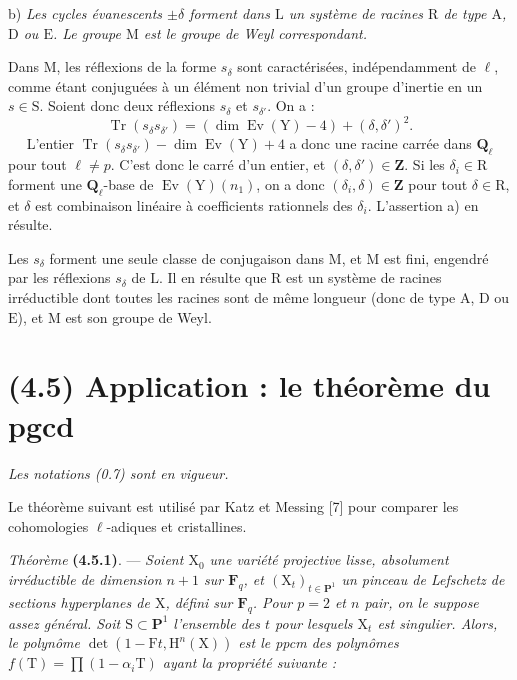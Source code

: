 \documentclass[11pt,leqno]{article}
\newcommand{\Page}[1]{\ifvmode\noindent\else\unskip\ \fi{\footnotesize\textcolor{gray}{[p.\,#1]}}\ \ignorespaces}
\begin{document}
b) \textit{Les cycles évanescents \(\pm\delta\) forment dans \(\mathrm{L}\) un système de racines \(\mathrm{R}\) de type \(\mathrm{A}\), \(\mathrm{D}\) ou \(\mathrm{E}\). Le groupe \(\mathrm{M}\) est le groupe de Weyl correspondant.}

Dans \(\mathrm{M}\), les réflexions de la forme \(s_\delta\) sont caractérisées, indépendamment de \(\ell\), comme étant conjuguées à un élément non trivial d’un groupe d’inertie en un \(s\in\mathrm{S}\). Soient donc deux réflexions \(s_\delta\) et \(s_{\delta'}\). On a :
\[
\operatorname{Tr}(s_\delta s_{\delta'})
=(\dim\operatorname{Ev}(\mathrm{Y})-4)+(\delta,\delta')^2.
\]
\Page{231}
L’entier \(\operatorname{Tr}(s_\delta s_{\delta'})-\dim\operatorname{Ev}(\mathrm{Y})+4\) a donc une racine carrée dans \(\mathbf{Q}_\ell\) pour tout \(\ell\neq p\). C’est donc le carré d’un entier, et \((\delta,\delta')\in\mathbf{Z}\). Si les \(\delta_i\in\mathrm{R}\) forment une \(\mathbf{Q}_\ell\)-base de \(\operatorname{Ev}(\mathrm{Y})(n_1)\), on a donc \((\delta_i,\delta)\in\mathbf{Z}\) pour tout \(\delta\in\mathrm{R}\), et \(\delta\) est combinaison linéaire à coefficients rationnels des \(\delta_i\). L’assertion a) en résulte.

Les \(s_\delta\) forment une seule classe de conjugaison dans \(\mathrm{M}\), et \(\mathrm{M}\) est fini, engendré par les réflexions \(s_\delta\) de \(\mathrm{L}\). Il en résulte que \(\mathrm{R}\) est un système de racines irréductible dont toutes les racines sont de même longueur (donc de type \(\mathrm{A}\), \(\mathrm{D}\) ou \(\mathrm{E}\)), et \(\mathrm{M}\) est son groupe de Weyl.

\section*{(4.5) Application : le théorème du pgcd}

\textit{Les notations \textup{(0.7)} sont en vigueur.}

Le théorème suivant est utilisé par Katz et Messing [7] pour comparer les cohomologies \(\ell\)-adiques et cristallines.

\textit{Théorème} \textbf{(4.5.1)}. — \textit{Soient \(\mathrm{X}_0\) une variété projective lisse, absolument irréductible de dimension \(n+1\) sur \(\mathbf{F}_q\), et \((\mathrm{X}_t)_{t\in\mathbf{P}^1}\) un pinceau de Lefschetz de sections hyperplanes de \(\mathrm{X}\), défini sur \(\mathbf{F}_q\). Pour \(p=2\) et \(n\) pair, on le suppose assez général. Soit \(\mathrm{S}\subset\mathbf{P}^1\) l’ensemble des \(t\) pour lesquels \(\mathrm{X}_t\) est singulier. Alors, le polynôme \(\det(1-\mathrm{F}t,\mathrm{H}^n(\mathrm{X}))\) est le ppcm des polynômes \(f(\mathrm{T})=\prod(1-\alpha_i\mathrm{T})\) ayant la propriété suivante :}
\end{document}
